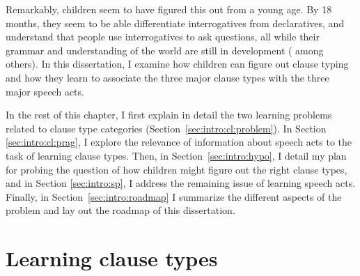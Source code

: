 Remarkably, children seem to have figured this out from a young age. By 18 months, they seem to be able differentiate interrogatives from declaratives, and understand that people use interrogatives to ask questions, all while their grammar and understanding of the world are still in development (\cite{geffenmintz2011,geffenmintz2015wordorder,casillas2017turn,perkins2019,marshmallowqueen} among others). In this dissertation, I examine how children can figure out clause typing and how they learn to associate the three major clause types with the three major speech acts. %


In the rest of this chapter, I first explain in detail the two learning problems related to clause type categories (Section~\ref{sec:intro:cl:problem}). In Section \ref{sec:intro:cl:prag}, I explore the relevance of information about speech acts to the task of learning clause types. Then, in Section~\ref{sec:intro:hypo}, I detail my plan for probing the question of how children might figure out the right clause types, and in Section \ref{sec:intro:sp}, I address the remaining issue of learning speech acts. Finally, in Section~\ref{sec:intro:roadmap} I summarize the different aspects of the problem and lay out the roadmap of this dissertation. 

\section{Learning clause types}
\label{sec:intro:cl}
